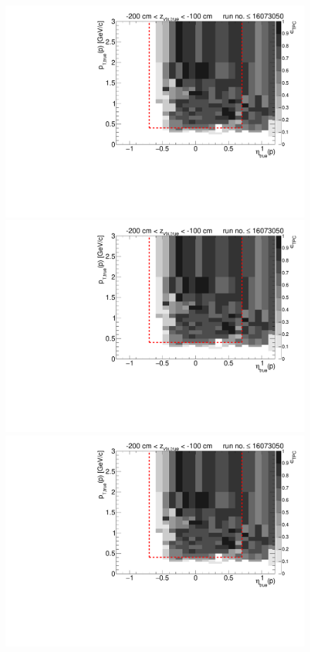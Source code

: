 \begin{figure}[hb]
{  \includegraphics[width=\linewidth,page=6]{graphics/eff/Eff2D_TPC_proton_Minus_RunRange1.pdf}\\
  \includegraphics[width=\linewidth,page=8]{graphics/eff/Eff2D_TPC_proton_Minus_RunRange1.pdf}\\
  \includegraphics[width=\linewidth,page=10]{graphics/eff/Eff2D_TPC_proton_Minus_RunRange1.pdf}
}%
\end{figure}
